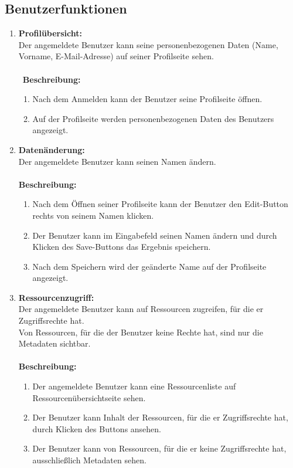 \documentclass[parskip=full,11pt]{scrartcl}
\def\threedigits#1{%
  \ifnum#1<10 0\fi
  \ifnum#1<1 0\fi
  \number#1}
\begin{document}
\subsection{Benutzerfunktionen}
\begin{enumerate}[label={\textbf{/F\protect\threedigits{\theenumi}0/}}, leftmargin=*]
\item \label{FAB1} \textbf{Profilübersicht:} \\ Der angemeldete Benutzer kann seine personenbezogenen Daten (Name, Vorname, E-Mail-Adresse) auf seiner Profilseite sehen.\\\\\
\textbf{Beschreibung:}\\
\begin{enumerate}[label=(\arabic*), leftmargin=*]
\item Nach dem Anmelden kann der Benutzer seine Profilseite öffnen.
\item Auf der Profilseite werden personenbezogenen Daten des Benutzers angezeigt.
\end{enumerate}

\item \label{FAB2} \textbf{Datenänderung:} \\ Der angemeldete Benutzer kann seinen Namen ändern.\\\\
\textbf{Beschreibung:}\\
\begin{enumerate}[label=(\arabic*), leftmargin=*]
\item Nach dem Öffnen seiner Profilseite kann der Benutzer den Edit-Button rechts von seinem Namen klicken.
\item Der Benutzer kann im Eingabefeld seinen Namen ändern und durch Klicken des Save-Buttons das Ergebnis speichern.
\item  Nach dem Speichern wird der geänderte Name auf der Profilseite angezeigt.
\end{enumerate}

\item \label{FAB3} \textbf{Ressourcenzugriff:} \\Der angemeldete Benutzer kann auf Ressourcen zugreifen, für die er Zugriffsrechte hat.
\\ Von Ressourcen, für die der Benutzer keine Rechte hat, sind nur die Metadaten sichtbar.\\\\
\textbf{Beschreibung:}\\
\begin{enumerate}[label=(\arabic*), leftmargin=*]
\item Der angemeldete Benutzer kann eine Ressourcenliste auf Ressourcenübersichtseite sehen.
\item Der Benutzer kann Inhalt der Ressourcen, für die er Zugriffsrechte hat, durch Klicken des Buttons \grqq \: ansehen.
\item Der Benutzer kann von Ressourcen, für die er keine Zugriffsrechte hat, ausschließlich Metadaten sehen.
\end{enumerate}


\end{enumerate}
\end{document}
